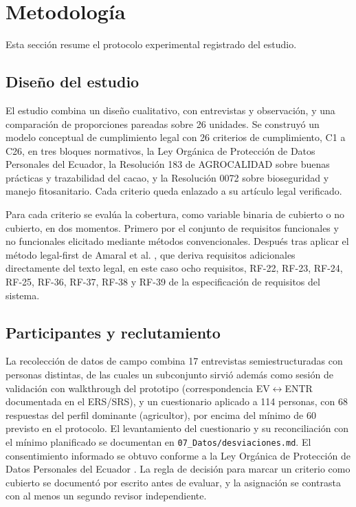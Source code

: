 \documentclass[pdflatex,sn-mathphys-num]{sn-jnl}
\begin{document}
\section{Metodolog\'ia}\label{sec:metodologia}

Esta secci\'on resume el protocolo experimental registrado del estudio.

\subsection{Dise\~no del estudio}

El estudio combina un dise\~no cualitativo, con entrevistas y observaci\'on, y una comparaci\'on de proporciones pareadas sobre 26 unidades. Se construy\'o un modelo conceptual de cumplimiento legal con 26 criterios de cumplimiento, C1 a C26, en tres bloques normativos, la Ley Org\'anica de Protecci\'on de Datos Personales del Ecuador, la Resoluci\'on 183 de AGROCALIDAD sobre buenas pr\'acticas y trazabilidad del cacao, y la Resoluci\'on 0072 sobre bioseguridad y manejo fitosanitario. Cada criterio queda enlazado a su art\'iculo legal verificado.

Para cada criterio se eval\'ua la cobertura, como variable binaria de cubierto o no cubierto, en dos momentos. Primero por el conjunto de requisitos funcionales y no funcionales elicitado mediante m\'etodos convencionales. Despu\'es tras aplicar el m\'etodo legal-first de Amaral et al. \cite{amaral2021}, que deriva requisitos adicionales directamente del texto legal, en este caso ocho requisitos, RF-22, RF-23, RF-24, RF-25, RF-36, RF-37, RF-38 y RF-39 de la especificaci\'on de requisitos del sistema.

\subsection{Participantes y reclutamiento}

La recolecci\'on de datos de campo combina 17 entrevistas semiestructuradas con personas distintas, de las cuales un subconjunto sirvi\'o adem\'as como sesi\'on de validaci\'on con walkthrough del prototipo (correspondencia EV$\leftrightarrow$ENTR documentada en el ERS/SRS), y un cuestionario aplicado a 114 personas, con 68 respuestas del perfil dominante (agricultor), por encima del m\'inimo de 60 previsto en el protocolo. El levantamiento del cuestionario y su reconciliaci\'on con el m\'inimo planificado se documentan en \texttt{07\_Datos/desviaciones.md}. El consentimiento informado se obtuvo conforme a la Ley Org\'anica de Protecci\'on de Datos Personales del Ecuador \cite{lopdp2021}. La regla de decisi\'on para marcar un criterio como cubierto se document\'o por escrito antes de evaluar, y la asignaci\'on se contrasta con al menos un segundo revisor independiente.
\end{document}
